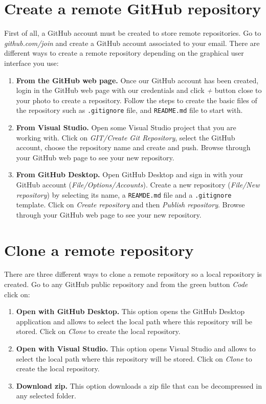  
 \section{Create a remote  GitHub repository}
 
 First of all, a GitHub account must be created to store remote repositories. 
 Go to \textit{github.com/join} and create a GitHub account associated to your email.
 There are different ways to create a remote repository depending on the graphical user 
 interface you use: 
   
 \begin{enumerate}
 \item {\bf From the GitHub web page.} Once our GitHub account has been created, login in the GitHub web page 
 with our credentials and click \textit{+} button close to your photo to create a repository. 
 Follow the steps to create the basic files of the repository such as \texttt{.gitignore} file,  
 and \texttt{README.md} file to start with. 
   
 \item {\bf From Visual Studio. } 
 Open some Visual Studio project that you are working with. 
Click on \textit{GIT/Create Git Repository}, 
 select the GitHub account, choose the repository name and create and push.
Browse through your  GitHub web page to see your new repository. 
 
 \item {\bf From GitHub Desktop. }
  Open GitHub Desktop and sign in with your GitHub account 
  (\textit{File/Options/Accounts}).  
  Create a new repository (\textit{File/New repository}) by selecting its name, 
  a \texttt{REAMDE.md} file and a \texttt{.gitignore} template. 
  Click on \textit{Create repository} and then \textit{Publish repository}.
  Browse through your GitHub web page to see your new repository.
  \end{enumerate} 



\section{Clone a remote repository}

There are three different ways to clone a remote repository 
so a local repository is created. 
Go to any GitHub public repository and from the green button  \textit{Code}
click on: 
 \begin{enumerate}
 \item {\bf  Open with GitHub Desktop.}
 This option opens the GitHub Desktop application and allows to select the  
 local path where this repository will be stored. 
  Click on \textit{Clone} to create the local repository. 
 \item {\bf  Open with Visual Studio. } 
 This option opens Visual Studio and allows to select the local path where this repository 
  will be stored. Click on \textit{Clone} to create the local repository. 
 \item {\bf Download zip. } 
 This option downloads a zip file that can be decompressed in any selected folder.
  
\end{enumerate} 



